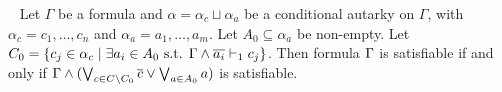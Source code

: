 %
%
%
%
%
%
%





\begin{theorem}~\label{thm:shrunkgbcequisat} Let $\Gamma$ be a formula and
    $\alpha = \alpha_c \sqcup \alpha_a$ be a conditional autarky on $\Gamma$,
    with $\alpha_c = c_1, \dots, c_n$ and $\alpha_a = a_1, \dots, a_m$.
    Let $A_0 \subseteq \alpha_a$ be non-empty.
    Let $C_0 = \{c_j \in \alpha_c
\mid \exists a_i \in A_0 \text{ s.t. }
\Gamma \land \overline{a_i} \vdash_1 c_j \}$.
    Then formula $\Gamma$ is satisfiable if and only if
    $\Gamma \land (\bigvee_{c \in C \backslash C_0} \overline{c} \lor
    \bigvee_{a \in A_0} a)$ is satisfiable.
\end{theorem}


